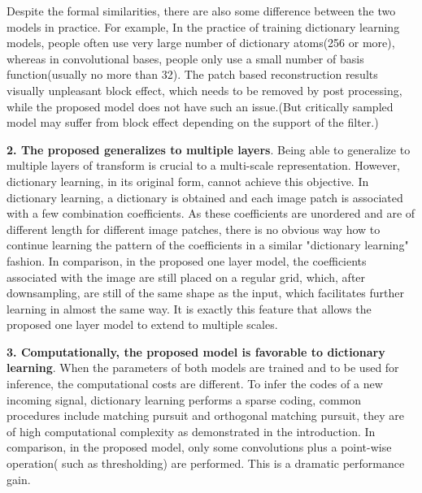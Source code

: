 \documentclass[a4paper]{article}
\begin{document}
Despite the formal similarities, there are also some difference between the two models in practice. For example, In the practice of training dictionary learning models, people often use very large number of dictionary atoms(256 or more), whereas in convolutional bases, people only use a small number of basis function(usually no more than 32). The patch based reconstruction results visually unpleasant block effect, which needs to be removed by post processing, while the proposed model does not have such an issue.(But critically sampled model may suffer from block effect depending on the support of the filter.)

\textbf{2. The proposed generalizes to multiple layers}. Being able to generalize to multiple layers of transform is crucial to a multi-scale representation. However, dictionary learning, in its original form, cannot achieve this objective. In dictionary learning, a dictionary is obtained and each image patch is associated with a few combination coefficients. As these coefficients are unordered and are of different length for different image patches, there is no obvious way how to continue learning the pattern of the coefficients in a similar "dictionary learning" fashion. In comparison, in the proposed one layer model, the coefficients associated with the image are still placed on a regular grid, which, after downsampling, are still of the same shape as the input, which facilitates further learning in almost the same way. It is exactly this feature that allows the proposed one layer model to extend to multiple scales. 

\textbf{3. Computationally, the proposed model is favorable to dictionary learning}. When the parameters of both models are trained and to be used for inference, the computational costs are different. To infer the codes of a new incoming signal, dictionary learning performs a sparse coding, common procedures include matching pursuit and orthogonal matching pursuit\cite{tropp2007signal}, they are of high computational complexity as demonstrated in the introduction. In comparison, in the proposed model, only some convolutions plus a point-wise operation( such as thresholding) are performed. This is a dramatic performance gain.
\end{document}
